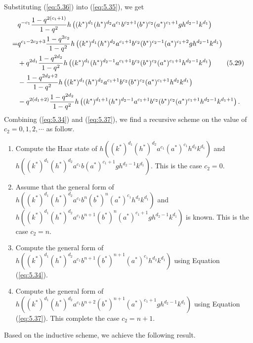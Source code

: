 \documentclass[table,a4paper,reqno]{amsart}
\numberwithin{equation}{section}
\theoremstyle{definition}
\begin{document}
Substituting (\ref{eq:5.36}) into (\ref{eq:5.35}), we get
\begin{align}\label{eq:5.37}\stepcounter{equation}
        &q^{-c_1}\frac{1-q^{2(c_1+1)}}{1-q^2}h\left((k^*)^{d_1}(h^*)^{d_2}a^{c_1}b^{c_2+1}(b^*)^{c_2}(a^*)^{c_1+1}gh^{d_2-1}k^{d_1}\right)\notag\\
        =&q^{c_1-2c_2+3}\frac{1-q^{2c_2}}{1-q^2}h\left((k^*)^{d_1}(h^*)^{d_2}a^{c_1+1}b^{c_2}(b^*)^{c_2-1}(a^*)^{c_1+2}gh^{d_2-1}k^{d_1}\right)\notag\\
        &+q^{2d_1}\frac{1-q^{2d_2}}{1-q^2}h\left((k^*)^{d_1}(h^*)^{d_2-1}a^{c_1+1}b^{c_2}(b^*)^{c_2}(a^*)^{c_1+1}h^{d_2-1}k^{d_1}\right)\tag{5.29}\\
        &-\frac{1-q^{2d_2+2}}{1-q^2}h\left((k^*)^{d_1}(h^*)^{d_2}a^{c_1+1}b^{c_2}(b^*)^{c_2}(a^*)^{c_1+1}h^{d_2}k^{d_1}\right)\notag\\
        &-q^{2(d_1+2)}\frac{1-q^{2d_2}}{1-q^2}h\left((k^*)^{d_1+1}(h^*)^{d_2-1}a^{c_1+1}b^{c_2}(b^*)^{c_2}(a^*)^{c_1+1}h^{d_2-1}k^{d_1+1}\right).\notag
\end{align}
Combining (\ref{eq:5.34}) and (\ref{eq:5.37}), we find a recursive scheme on the value of $c_2=0,1,2,\cdots$ as follow.
\begin{enumerate}
    \item[1.] Compute the Haar state of $h\left((k^*)^{d_1}(h^*)^{d_2}a^{c_1}(a^*)^{c_1}h^{d_2}k^{d_1}\right)$ and\\ $h\left((k^*)^{d_1}(h^*)^{d_2}a^{c_1}b(a^*)^{c_1+1}gh^{d_2-1}k^{d_1}\right)$. This is the case $c_2=0$.
    \item[2.] Assume that the general form of $h\left((k^*)^{d_1}(h^*)^{d_2}a^{c_1}b^{n}(b^*)^{n}(a^*)^{c_1}h^{d_2}k^{d_1}\right)$ and $h\left((k^*)^{d_1}(h^*)^{d_2}a^{c_1}b^{n+1}(b^*)^{n}(a^*)^{c_1+1}gh^{d_2-1}k^{d_1}\right)$ is known. This is the case $c_2=n$.
    \item[3.] Compute the general form of $h\left((k^*)^{d_1}(h^*)^{d_2}a^{c_1}b^{n+1}(b^*)^{n+1}(a^*)^{c_1}h^{d_2}k^{d_1}\right)$ using Equation (\ref{eq:5.34}).
    \item[4.] Compute the general form of $h\left((k^*)^{d_1}(h^*)^{d_2}a^{c_1}b^{n+2}(b^*)^{n+1}(a^*)^{c_1+1}gh^{d_2-1}k^{d_1}\right)$ using Equation (\ref{eq:5.37}). This complete the case $c_2=n+1$.
\end{enumerate}
Based on the inductive scheme, we achieve the following result.
\end{document}
